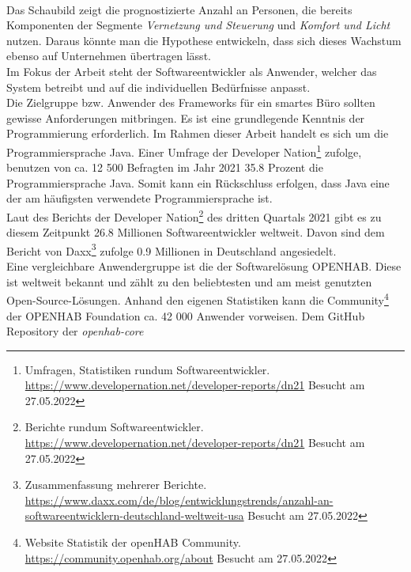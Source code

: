         \\
        Das Schaubild zeigt die prognostizierte Anzahl an Personen, die bereits Komponenten der Segmente 
        \textit{Vernetzung und Steuerung} und \textit{Komfort und Licht} nutzen. Daraus könnte man die Hypothese entwickeln, dass sich dieses Wachstum 
        ebenso auf Unternehmen übertragen lässt. 
        \\
        \linebreak
        Im Fokus der Arbeit steht der Softwareentwickler als Anwender, welcher das System betreibt und auf die 
        individuellen Bedürfnisse anpasst. 
        \\
        Die Zielgruppe bzw. Anwender des Frameworks für ein smartes Büro sollten gewisse Anforderungen mitbringen.
        Es ist eine grundlegende Kenntnis der Programmierung erforderlich. Im Rahmen dieser Arbeit handelt es sich 
        um die Programmiersprache Java. Einer Umfrage der Developer Nation\footnote{Umfragen, Statistiken rundum Softwareentwickler. \url{https://www.developernation.net/developer-reports/dn21} Besucht am 27.05.2022} 
        zufolge, benutzen von ca. 12 500 Befragten im Jahr 2021 35.8 Prozent die Programmiersprache Java. Somit kann 
        ein Rückschluss erfolgen, dass Java eine der am häufigsten verwendete Programmiersprache ist.
        \\
        \linebreak
        Laut des Berichts der Developer Nation\footnote{Berichte rundum Softwareentwickler. \url{https://www.developernation.net/developer-reports/dn21} Besucht am 27.05.2022}
        des dritten Quartals 2021 gibt es zu diesem Zeitpunkt 26.8 Millionen Softwareentwickler weltweit. Davon sind dem 
        Bericht von Daxx\footnote{Zusammenfassung mehrerer Berichte. \url{https://www.daxx.com/de/blog/entwicklungstrends/anzahl-an-softwareentwicklern-deutschland-weltweit-usa} Besucht am 27.05.2022}
        zufolge 0.9 Millionen in Deutschland angesiedelt. 
        \\
        \linebreak
        Eine vergleichbare Anwendergruppe ist die der Softwarelösung \acs{OPENHAB}. Diese ist weltweit bekannt und zählt zu den 
        beliebtesten und am meist genutzten Open-Source-Lösungen. Anhand den eigenen Statistiken kann die Community\footnote{Website Statistik der openHAB Community. \url{https://community.openhab.org/about} Besucht am 27.05.2022} 
        der \acs{OPENHAB} Foundation ca. 42 000 Anwender vorweisen. Dem GitHub Repository der \textit{openhab-core} 
